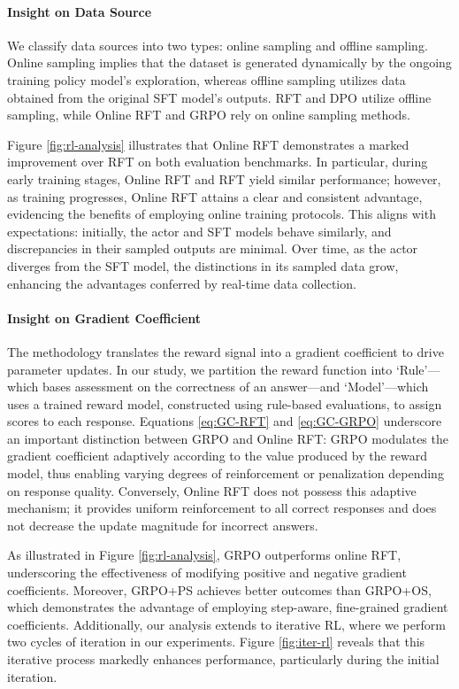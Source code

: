 \begin{itemize}[topsep=0pt]
\paragraph{Insight on Data Source} We classify data sources into two types: online sampling and offline sampling. Online sampling implies that the dataset is generated dynamically by the ongoing training policy model’s exploration, whereas offline sampling utilizes data obtained from the original SFT model’s outputs. RFT and DPO utilize offline sampling, while Online RFT and GRPO rely on online sampling methods.

Figure \ref{fig:rl-analysis} illustrates that Online RFT demonstrates a marked improvement over RFT on both evaluation benchmarks. In particular, during early training stages, Online RFT and RFT yield similar performance; however, as training progresses, Online RFT attains a clear and consistent advantage, evidencing the benefits of employing online training protocols. This aligns with expectations: initially, the actor and SFT models behave similarly, and discrepancies in their sampled outputs are minimal. Over time, as the actor diverges from the SFT model, the distinctions in its sampled data grow, enhancing the advantages conferred by real-time data collection.

\paragraph{Insight on Gradient Coefficient} The methodology translates the reward signal into a gradient coefficient to drive parameter updates. In our study, we partition the reward function into `Rule'—which bases assessment on the correctness of an answer—and `Model'—which uses a trained reward model, constructed using rule-based evaluations, to assign scores to each response. Equations \ref{eq:GC-RFT} and \ref{eq:GC-GRPO} underscore an important distinction between GRPO and Online RFT: GRPO modulates the gradient coefficient adaptively according to the value produced by the reward model, thus enabling varying degrees of reinforcement or penalization depending on response quality. Conversely, Online RFT does not possess this adaptive mechanism; it provides uniform reinforcement to all correct responses and does not decrease the update magnitude for incorrect answers.

As illustrated in Figure \ref{fig:rl-analysis}, GRPO outperforms online RFT, underscoring the effectiveness of modifying positive and negative gradient coefficients. Moreover, GRPO+PS achieves better outcomes than GRPO+OS, which demonstrates the advantage of employing step-aware, fine-grained gradient coefficients. Additionally, our analysis extends to iterative RL, where we perform two cycles of iteration in our experiments. Figure \ref{fig:iter-rl} reveals that this iterative process markedly enhances performance, particularly during the initial iteration.


\end{itemize}

